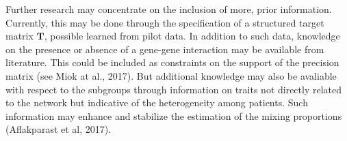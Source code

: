 \documentclass[10pt]{article}
\begin{document}
Further research may concentrate on the inclusion of more, prior information. Currently, this may be done through the specification of a structured target matrix $\mathbf{T}$, possible learned from pilot data. In addition to such data, knowledge on the presence or absence of a gene-gene interaction may be available from literature. This could be included as constraints on the support of the precision matrix (see Miok at al., 2017). But additional knowledge may also be avaliable with respect to the subgroups through information on traits not directly related to the network but indicative of the heterogeneity among patients. Such information may enhance and stabilize the estimation of the mixing proportions (Aflakparast et al, 2017). 










\setlength{\bibsep}{2pt}
% 
% 


% 
% 

\setlength{\bibsep}{2pt}


\newpage
\end{document}
